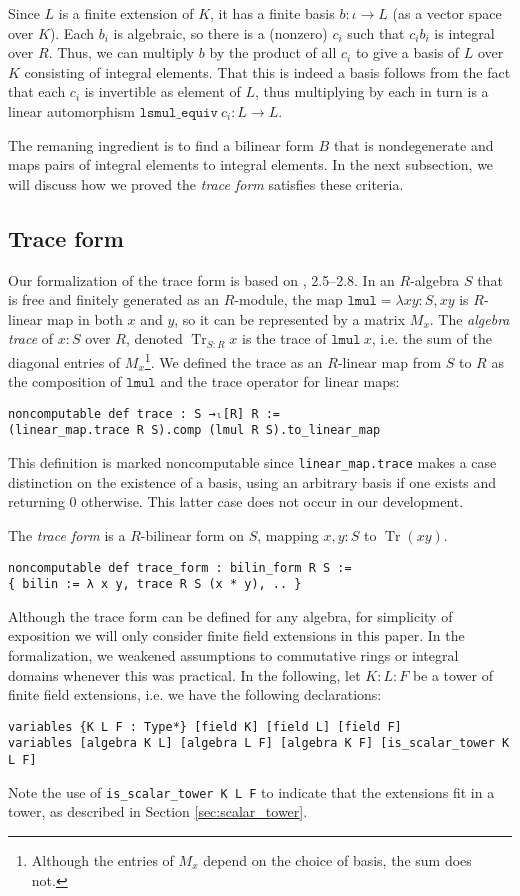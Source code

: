 \documentclass[a4paper,USenglish,cleveref, autoref, thm-restate]{lipics-v2021}
\newcommand{\lean}[1]{\texttt{#1}\xspace} %
\DeclareMathOperator{\Tr}{\mathrm{Tr}}
\begin{document}
Since $L$ is a finite extension of $K$, it has a finite basis $b : \iota \to L$ (as a vector space over $K$).
Each $b_i$ is algebraic, so there is a (nonzero) $c_i$ such that $c_i b_i$ is integral over $R$.
Thus, we can multiply $b$ by the product of all $c_i$ to give a basis of $L$ over $K$ consisting of integral elements.
That this is indeed a basis follows from the fact that each $c_i$ is invertible as element of $L$,
thus multiplying by each in turn is a linear automorphism $\lean{lsmul\_equiv}\ c_i : L \to L$.

The remaning ingredient is to find a bilinear form $B$ that is nondegenerate and maps pairs of integral elements to integral elements. In the next subsection, we will discuss how we proved the \emph{trace form} satisfies these criteria.

\subsection{Trace form}
Our formalization of the trace form is based on \cite{Neukirch}, 2.5--2.8.
In an $R$-algebra $S$ that is free and finitely generated as an $R$-module,
the map $\lean{lmul} = \lambda x y : S, xy$ is $R$-linear map in both $x$ and $y$, so it can be represented by a matrix $M_x$.
The \emph{algebra trace} of $x : S$ over $R$, denoted $\Tr_{S : R} x$ is the trace of $\lean{lmul}\ x$, i.e. the sum of the diagonal entries of $M_x$\footnote{Although the entries of $M_x$ depend on the choice of basis, the sum does not.}.
We defined the trace as an $R$-linear map from $S$ to $R$ as the composition of $\lean{lmul}$ and the trace operator for linear maps:
\begin{lstlisting}
noncomputable def trace : S →ₗ[R] R :=
(linear_map.trace R S).comp (lmul R S).to_linear_map
\end{lstlisting}
This definition is marked noncomputable since \lean{linear\_map.trace} makes a case distinction on the existence of a basis,
using an arbitrary basis if one exists and returning $0$ otherwise.
This latter case does not occur in our development.

The \emph{trace form} is a $R$-bilinear form on $S$, mapping $x, y : S$ to $\Tr(xy)$.
\begin{lstlisting}
noncomputable def trace_form : bilin_form R S :=
{ bilin := λ x y, trace R S (x * y), .. }
\end{lstlisting}

Although the trace form can be defined for any algebra,
for simplicity of exposition we will only consider finite field extensions in this paper.
In the formalization, we weakened assumptions to commutative rings or integral domains whenever this was practical.
In the following, let $K : L : F$ be a tower of finite field extensions,
i.e. we have the following declarations:
\begin{lstlisting}
variables {K L F : Type*} [field K] [field L] [field F]
variables [algebra K L] [algebra L F] [algebra K F] [is_scalar_tower K L F]
\end{lstlisting}
Note the use of \lean{is\_scalar\_tower K L F} to indicate that the extensions fit in a tower, as described in Section \ref{sec:scalar_tower}.
\end{document}
